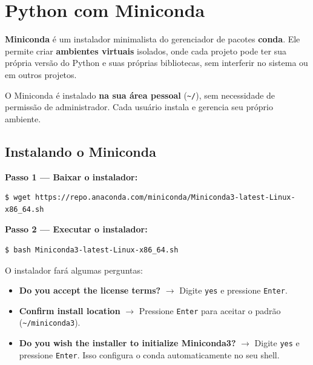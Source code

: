 \documentclass[11pt, a4paper]{article}
\begin{document}
\section{Python com Miniconda}
\label{sec:python}

\textbf{Miniconda} é um instalador minimalista do gerenciador de pacotes
\textbf{conda}. Ele permite criar \textbf{ambientes virtuais} isolados, onde
cada projeto pode ter sua própria versão do Python e suas próprias bibliotecas,
sem interferir no sistema ou em outros projetos.

\begin{info}
  O Miniconda é instalado \textbf{na sua área pessoal} (\texttt{\textasciitilde/}),
  sem necessidade de permissão de administrador. Cada usuário instala e gerencia
  seu próprio ambiente.
\end{info}

\subsection{Instalando o Miniconda}

\textbf{Passo 1 — Baixar o instalador:}

\begin{lstlisting}[style=terminal]
$ wget https://repo.anaconda.com/miniconda/Miniconda3-latest-Linux-x86_64.sh
\end{lstlisting}

\textbf{Passo 2 — Executar o instalador:}

\begin{lstlisting}[style=terminal]
$ bash Miniconda3-latest-Linux-x86_64.sh
\end{lstlisting}

O instalador fará algumas perguntas:
\begin{itemize}
  \item \textbf{Do you accept the license terms?} $\rightarrow$ Digite \texttt{yes} e pressione
        \texttt{Enter}.
  \item \textbf{Confirm install location} $\rightarrow$ Pressione \texttt{Enter} para aceitar
        o padrão (\texttt{\textasciitilde/miniconda3}).
  \item \textbf{Do you wish the installer to initialize Miniconda3?} $\rightarrow$ Digite
        \texttt{yes} e pressione \texttt{Enter}. Isso configura o conda
        automaticamente no seu shell.
\end{itemize}
\end{document}
